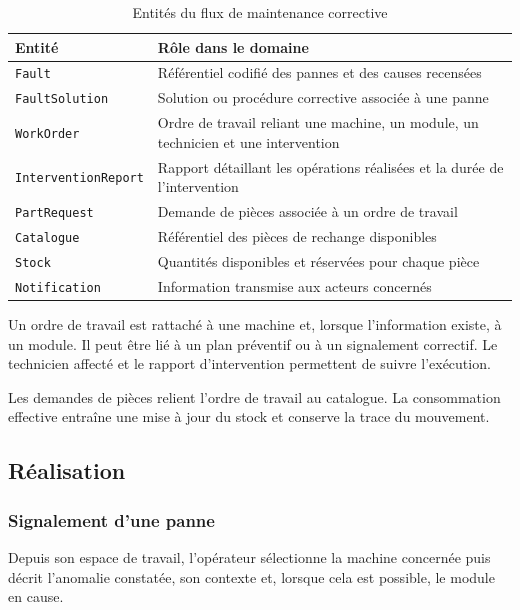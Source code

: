 \begin{table}[H]
\centering
\caption{Entités du flux de maintenance corrective}
\label{tab:modele-corrective}
\small
\begin{tabularx}{\textwidth}{|p{3.2cm}|X|}
\hline
\textbf{Entité} & \textbf{Rôle dans le domaine} \\
\hline
\texttt{Fault} & Référentiel codifié des pannes et des causes recensées \\
\hline
\texttt{FaultSolution} & Solution ou procédure corrective associée à une panne \\
\hline
\texttt{WorkOrder} & Ordre de travail reliant une machine, un module, un technicien et une intervention \\
\hline
\texttt{InterventionReport} & Rapport détaillant les opérations réalisées et la durée de l'intervention \\
\hline
\texttt{PartRequest} & Demande de pièces associée à un ordre de travail \\
\hline
\texttt{Catalogue} & Référentiel des pièces de rechange disponibles \\
\hline
\texttt{Stock} & Quantités disponibles et réservées pour chaque pièce \\
\hline
\texttt{Notification} & Information transmise aux acteurs concernés \\
\hline
\end{tabularx}
\end{table}

Un ordre de travail est rattaché à une machine et, lorsque l'information existe, à un module. Il peut être lié à un plan préventif ou à un signalement correctif. Le technicien affecté et le rapport d'intervention permettent de suivre l'exécution.

Les demandes de pièces relient l'ordre de travail au catalogue. La consommation effective entraîne une mise à jour du stock et conserve la trace du mouvement.

\subsection{Réalisation}

\subsubsection{Signalement d'une panne}

Depuis son espace de travail, l'opérateur sélectionne la machine concernée puis décrit l'anomalie constatée, son contexte et, lorsque cela est possible, le module en cause.

